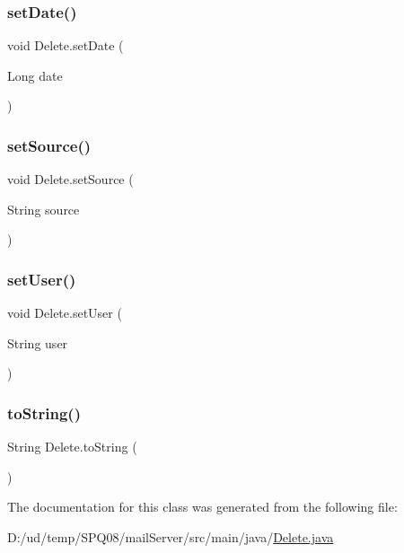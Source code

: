 \mbox{\label{class_delete_ae1062b901bae5ee6d6722448a12af7aa}} 
\subsubsection{\texorpdfstring{set\+Date()}{setDate()}}
{\footnotesize\ttfamily void Delete.\+set\+Date (\begin{DoxyParamCaption}\item[{Long}]{date }\end{DoxyParamCaption})}

\mbox{\label{class_delete_a2bddae4762dd4231ab53ee8b2409130b}} 
\subsubsection{\texorpdfstring{set\+Source()}{setSource()}}
{\footnotesize\ttfamily void Delete.\+set\+Source (\begin{DoxyParamCaption}\item[{String}]{source }\end{DoxyParamCaption})}

\mbox{\label{class_delete_a1154a1eb8b05320cf686691cd727dc50}} 
\subsubsection{\texorpdfstring{set\+User()}{setUser()}}
{\footnotesize\ttfamily void Delete.\+set\+User (\begin{DoxyParamCaption}\item[{String}]{user }\end{DoxyParamCaption})}

\mbox{\label{class_delete_ab39433411917f38404d915307d826600}} 
\subsubsection{\texorpdfstring{to\+String()}{toString()}}
{\footnotesize\ttfamily String Delete.\+to\+String (\begin{DoxyParamCaption}{ }\end{DoxyParamCaption})}



The documentation for this class was generated from the following file\+:\begin{DoxyCompactItemize}
\item 
D\+:/ud/temp/\+S\+P\+Q08/mail\+Server/src/main/java/\hyperlink{_delete_8java}{Delete.\+java}\end{DoxyCompactItemize}
